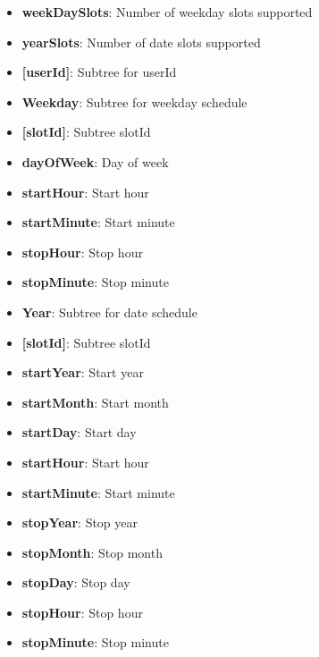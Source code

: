 \begin{itemize}
\item \textbf{weekDaySlots}: Number of weekday slots supported
\item \textbf{yearSlots}: Number of date slots supported
\item \textbf{[userId]}: Subtree for userId
\item \qquad\textbf{Weekday}: Subtree for weekday schedule
\item \qquad\qquad\textbf{[slotId]}: Subtree slotId
\item \qquad\qquad\qquad\textbf{dayOfWeek}: Day of week
\item \qquad\qquad\qquad\textbf{startHour}: Start hour
\item \qquad\qquad\qquad\textbf{startMinute}: Start minute
\item \qquad\qquad\qquad\textbf{stopHour}: Stop hour
\item \qquad\qquad\qquad\textbf{stopMinute}: Stop minute
\item \qquad\textbf{Year}: Subtree for date schedule
\item \qquad\qquad\textbf{[slotId]}: Subtree slotId
\item \qquad\qquad\qquad\textbf{startYear}: Start year
\item \qquad\qquad\qquad\textbf{startMonth}: Start month
\item \qquad\qquad\qquad\textbf{startDay}: Start day
\item \qquad\qquad\qquad\textbf{startHour}: Start hour
\item \qquad\qquad\qquad\textbf{startMinute}: Start minute
\item \qquad\qquad\qquad\textbf{stopYear}: Stop year
\item \qquad\qquad\qquad\textbf{stopMonth}: Stop month
\item \qquad\qquad\qquad\textbf{stopDay}: Stop day
\item \qquad\qquad\qquad\textbf{stopHour}: Stop hour
\item \qquad\qquad\qquad\textbf{stopMinute}: Stop minute
\end{itemize}

